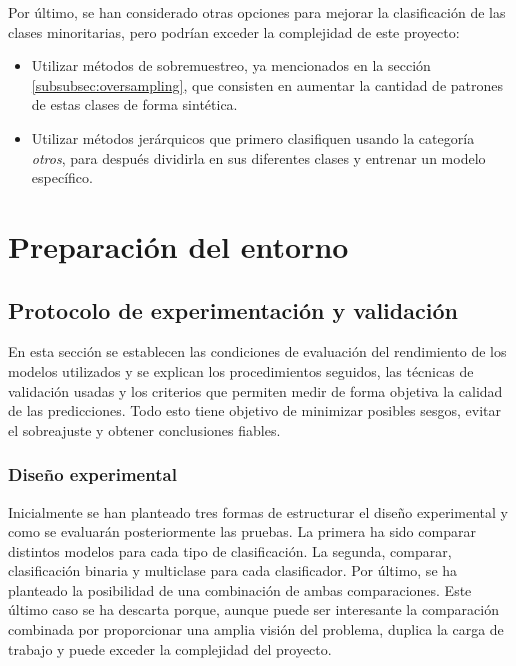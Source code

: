 Por último, se han considerado otras opciones para mejorar la clasificación de las clases minoritarias, pero podrían exceder la complejidad de este proyecto:

\begin{itemize}
	\item Utilizar métodos de sobremuestreo, ya mencionados en la sección \ref{subsubsec:oversampling}, que consisten en aumentar la cantidad de patrones de estas clases de forma sintética.
	\item Utilizar métodos jerárquicos que primero clasifiquen usando la categoría \textit{otros}, para después dividirla en sus diferentes clases y entrenar un modelo específico.
\end{itemize}

\section{Preparación del entorno}
\label{sec:prep_entornos}

\subsection{Protocolo de experimentación y validación}
\label{subsec:protocolo_exper}

En esta sección se establecen las condiciones de evaluación del rendimiento de los modelos utilizados y se explican los procedimientos seguidos, las técnicas de validación usadas y los criterios que permiten medir de forma objetiva la calidad de las predicciones. Todo esto tiene objetivo de minimizar posibles sesgos, evitar el sobreajuste y obtener conclusiones fiables.

\subsubsection{Diseño experimental}
\label{subsubsec:diseño}

Inicialmente se han planteado tres formas de estructurar el diseño experimental y como se evaluarán posteriormente las pruebas. La primera ha sido comparar distintos modelos para cada tipo de clasificación. La segunda, comparar, clasificación binaria y multiclase para cada clasificador. Por último, se ha planteado la posibilidad de una combinación de ambas comparaciones. Este último caso se ha descarta porque, aunque puede ser interesante la comparación combinada por proporcionar una amplia visión del problema, duplica la carga de trabajo y puede exceder la complejidad del proyecto.

